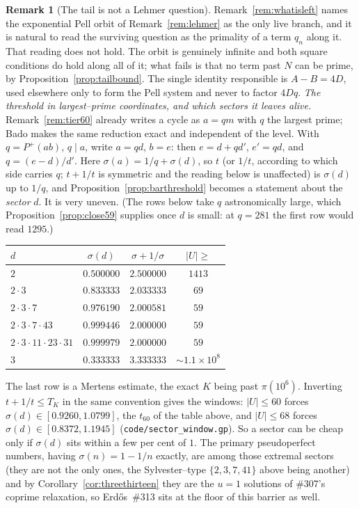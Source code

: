 \documentclass[11pt]{article}
\theoremstyle{definition}
\newtheorem{remark}[theorem]{Remark}
\begin{document}
\begin{remark}[The tail is not a Lehmer question]\label{rem:notlehmer}
Remark~\ref{rem:whatisleft} names the exponential Pell orbit of Remark~\ref{rem:lehmer} as the only live branch, and it is natural to read the surviving question as the primality of a term $q_n$ along it. That reading does not hold. The orbit is genuinely infinite and both square conditions do hold along all of it; what fails is that no term past $N$ can be prime, by Proposition~\ref{prop:tailbound}. The single identity responsible is $A-B=4D$, used elsewhere only to form the Pell
system and never to factor $4Dq$.
\emph{The threshold in largest--prime coordinates, and which sectors it leaves alive.} Remark~\ref{rem:tier60} already writes a cycle as $a=qm$ with $q$ the largest prime; Bado
\cite{Bado2026} makes the same reduction exact and independent of the level. With $q=P^{+}(ab)$,
$q\mid a$, write $a=qd$, $b=e$: then $e=d+qd'$, $e'=qd$, and $q=(e-d)/d'$. Here
$\sigma(a)=1/q+\sigma(d)$, so $t$ (or $1/t$, according to which side carries $q$; $t+1/t$ is
symmetric and the reading below is unaffected) is $\sigma(d)$ up to $1/q$, and
Proposition~\ref{prop:barthreshold} becomes a statement about the \emph{sector} $d$. It is very
uneven. \textup{(}The rows below take $q$ astronomically large, which
Proposition~\ref{prop:close59} supplies once $d$ is small: at $q=281$ the first row would read
$1295$.\textup{)}

\smallskip
\begin{center}
\begin{tabular}{lccc}
$d$ & $\sigma(d)$ & $\sigma+1/\sigma$ & $|U|\ge$\\ \hline
$2$ & $0.500000$ & $2.500000$ & $1413$\\
$2\cdot3$ & $0.833333$ & $2.033333$ & $69$\\
$2\cdot3\cdot7$ & $0.976190$ & $2.000581$ & $59$\\
$2\cdot3\cdot7\cdot43$ & $0.999446$ & $2.000000$ & $59$\\
$2\cdot3\cdot11\cdot23\cdot31$ & $0.999979$ & $2.000000$ & $59$\\
$3$ & $0.333333$ & $3.333333$ & ${\sim}1.1\times10^{8}$\\
\end{tabular}
\end{center}
\smallskip

The last row is a Mertens estimate, the exact $K$ being past $\pi(10^6)$. Inverting
$t+1/t\le T_K$ in the same convention gives the windows: $|U|\le60$ forces
$\sigma(d)\in[0.9260,1.0799]$, the $t_{60}$ of the table above, and $|U|\le68$ forces
$\sigma(d)\in[0.8372,1.1945]$ \textup{(\texttt{code/sector\_window.gp})}. So a sector can be cheap
only if $\sigma(d)$ sits within a few per cent of $1$. The primary pseudoperfect numbers, having
$\sigma(n)=1-1/n$ exactly, are among those extremal sectors (they are not the only ones, the
Sylvester--type $\{2,3,7,41\}$ above being another) and by
Corollary~\ref{cor:threethirteen} they are the $u=1$ solutions of \#307's coprime relaxation, so
Erd\H{o}s~\#313 sits at the floor of this barrier as well.


\end{remark}
\end{document}
